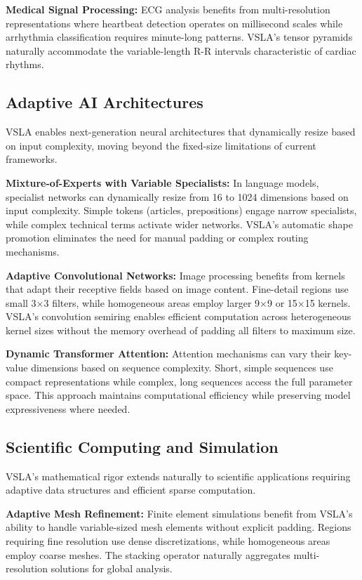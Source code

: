 \documentclass[11pt]{article}
\begin{document}
\textbf{Medical Signal Processing:} ECG analysis benefits from multi-resolution representations where heartbeat detection operates on millisecond scales while arrhythmia classification requires minute-long patterns. VSLA's tensor pyramids naturally accommodate the variable-length R-R intervals characteristic of cardiac rhythms.

\subsection{Adaptive AI Architectures}

VSLA enables next-generation neural architectures that dynamically resize based on input complexity, moving beyond the fixed-size limitations of current frameworks.

\textbf{Mixture-of-Experts with Variable Specialists:} In language models, specialist networks can dynamically resize from 16 to 1024 dimensions based on input complexity. Simple tokens (articles, prepositions) engage narrow specialists, while complex technical terms activate wider networks. VSLA's automatic shape promotion eliminates the need for manual padding or complex routing mechanisms.

\textbf{Adaptive Convolutional Networks:} Image processing benefits from kernels that adapt their receptive fields based on image content. Fine-detail regions use small 3×3 filters, while homogeneous areas employ larger 9×9 or 15×15 kernels. VSLA's convolution semiring enables efficient computation across heterogeneous kernel sizes without the memory overhead of padding all filters to maximum size.

\textbf{Dynamic Transformer Attention:} Attention mechanisms can vary their key-value dimensions based on sequence complexity. Short, simple sequences use compact representations while complex, long sequences access the full parameter space. This approach maintains computational efficiency while preserving model expressiveness where needed.

\subsection{Scientific Computing and Simulation}

VSLA's mathematical rigor extends naturally to scientific applications requiring adaptive data structures and efficient sparse computation.

\textbf{Adaptive Mesh Refinement:} Finite element simulations benefit from VSLA's ability to handle variable-sized mesh elements without explicit padding. Regions requiring fine resolution use dense discretizations, while homogeneous areas employ coarse meshes. The stacking operator naturally aggregates multi-resolution solutions for global analysis.
\end{document}
